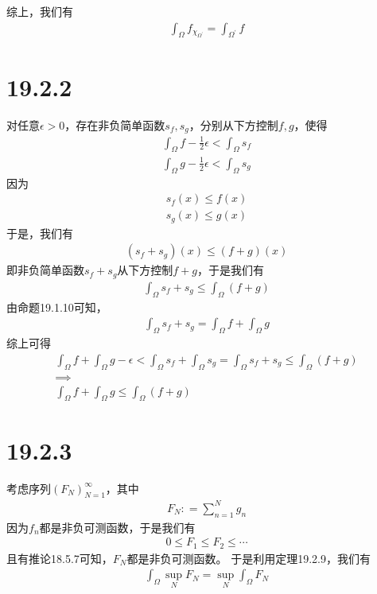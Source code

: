 \documentclass{article}
\begin{document}
\begin{itemize}
        综上，我们有
        \begin{align*}
          \int_{\Omega} f_{\chi_{\Omega^\prime}} = \int_{\Omega^\prime} f
        \end{align*}

\end{itemize}

\section*{19.2.2}

对任意$\epsilon > 0$，存在非负简单函数$s_f, s_g$，分别从下方控制$f, g$，使得
\begin{align*}
  \int_{\Omega} f - \frac{1}{2}\epsilon < \int_{\Omega} s_f \\
  \int_{\Omega} g - \frac{1}{2}\epsilon < \int_{\Omega} s_g
\end{align*}
因为
\begin{align*}
  s_f(x) \leq f(x) \\
  s_g(x) \leq g(x)
\end{align*}
于是，我们有
\begin{align*}
  (s_f + s_g)(x) \leq (f + g)(x)
\end{align*}
即非负简单函数$s_f + s_g$从下方控制$f + g$，于是我们有
\begin{align*}
  \int_{\Omega} s_f + s_g \leq \int_{\Omega} (f + g)
\end{align*}
由命题19.1.10可知，
\begin{align*}
  \int_{\Omega} s_f + s_g =  \int_{\Omega} f + \int_{\Omega} g
\end{align*}
综上可得
\begin{align*}
  \int_{\Omega} f + \int_{\Omega} g - \epsilon < \int_{\Omega} s_f + \int_{\Omega} s_g = \int_{\Omega} s_f + s_g \leq \int_{\Omega} (f + g) \\
  \implies \\
  \int_{\Omega} f + \int_{\Omega} g \leq \int_{\Omega} (f + g)
\end{align*}

\section*{19.2.3}

考虑序列$(F_N)_{N = 1}^\infty$，其中
\begin{align*}
  F_N : = \sum \limits_{n = 1}^N g_n
\end{align*}
因为$f_n$都是非负可测函数，于是我们有
\begin{align*}
  0 \leq F_1 \leq F_2 \leq \cdots 
\end{align*}
且有推论18.5.7可知，$F_N$都是非负可测函数。
于是利用定理19.2.9，我们有
\begin{align*}
  \int_{\Omega} \sup\limits_{N} F_N = \sup\limits_{N} \int_{\Omega} F_N
\end{align*}
\end{document}
